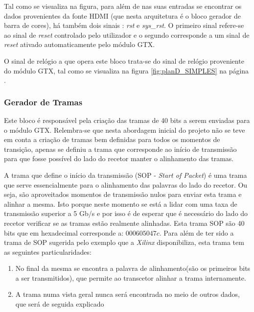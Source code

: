 Tal como se visualiza na figura, para além de nas suas entradas se encontrar os dados provenientes da fonte HDMI (que nesta arquitetura é o bloco gerador de barra de cores), há também dois sinais : \textit{rst} e \textit{sys\_rst}. O primeiro sinal refere-se ao sinal de \textit{reset} controlado pelo utilizador e o segundo corresponde a um sinal de \textit{reset} ativado automaticamente pelo módulo GTX.

O sinal de relógio a que opera este bloco trata-se do sinal de relógio proveniente do módulo GTX, tal como se visualiza na figura \ref{fig:planD_SIMPLES} na página \pageref{fig:planD_SIMPLES}.

\subsubsection*{Gerador de Tramas} \label{subsub:serial_frameGenerator}

Este bloco é responsável pela criação das tramas de 40 bits a serem enviadas para o módulo GTX. Relembra-se que nesta abordagem inicial do projeto não se teve em conta a criação de tramas bem definidas para todos os momentos de transição, apenas se definiu a trama que corresponde ao início de transmissão para que fosse possível do lado do recetor manter o alinhamento das tramas. 

A trama que define o início da transmissão (SOP - \textit{Start of Packet}) é uma trama que serve essencialmente para o alinhamento das palavras do lado do recetor. Ou seja, são aproveitados momentos de transmissão nulos para enviar esta trama e alinhar a mesma. Isto porque neste momento se está a lidar com uma taxa de transmissão superior a 5 Gb/s e por isso é de esperar que é necessário do lado do recetor verificar se as tramas estão realmente alinhadas.
Esta trama SOP são 40 bits que em hexadecimal corresponde a: $000605047c$. Para além de ter sido a trama de SOP sugerida pelo exemplo que a \textit{Xilinx} disponibiliza, esta trama tem as seguintes particularidades:
\begin{enumerate}
	\item No final da mesma se encontra a palavra de alinhamento(são os primeiros bits a ser transmitidos), que permite ao transcetor alinhar a trama internamente.
	\item A trama numa vista geral nunca será encontrada no meio de outros dados, que será de seguida explicado
\end{enumerate}

